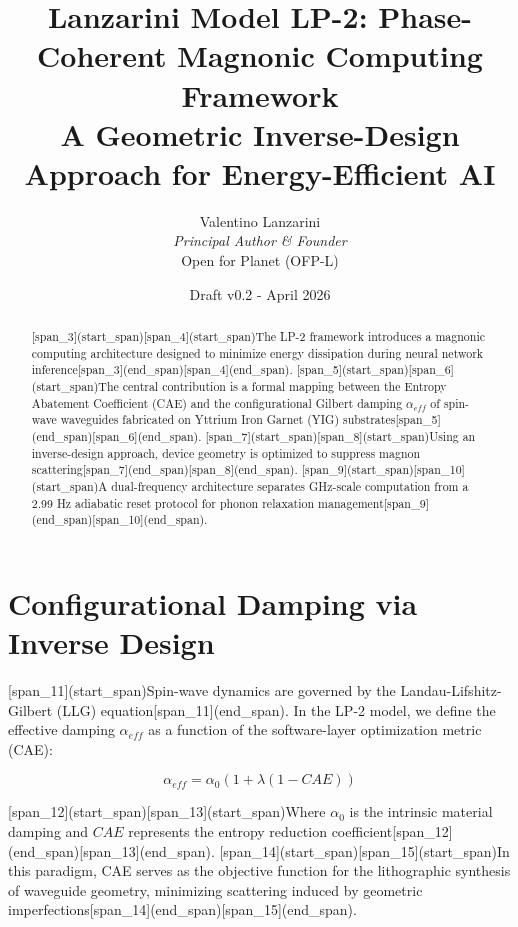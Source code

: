 \documentclass[11pt,a4paper]{article}
\title{Lanzarini Model LP-2: Phase-Coherent Magnonic Computing Framework \\ \large A Geometric Inverse-Design Approach for Energy-Efficient AI}
\author{Valentino Lanzarini \\ \textit{Principal Author \& Founder} \\ Open for Planet (OFP-L)}
\date{Draft v0.2 - April 2026}
\begin{document}
\maketitle

\begin{abstract}
[span_3](start_span)[span_4](start_span)The LP-2 framework introduces a magnonic computing architecture designed to minimize energy dissipation during neural network inference[span_3](end_span)[span_4](end_span). [span_5](start_span)[span_6](start_span)The central contribution is a formal mapping between the Entropy Abatement Coefficient (CAE) and the configurational Gilbert damping $\alpha_{eff}$ of spin-wave waveguides fabricated on Yttrium Iron Garnet (YIG) substrates[span_5](end_span)[span_6](end_span). [span_7](start_span)[span_8](start_span)Using an inverse-design approach, device geometry is optimized to suppress magnon scattering[span_7](end_span)[span_8](end_span). [span_9](start_span)[span_10](start_span)A dual-frequency architecture separates GHz-scale computation from a 2.99 Hz adiabatic reset protocol for phonon relaxation management[span_9](end_span)[span_10](end_span).
\end{abstract}

\section{Configurational Damping via Inverse Design}
[span_11](start_span)Spin-wave dynamics are governed by the Landau-Lifshitz-Gilbert (LLG) equation[span_11](end_span). In the LP-2 model, we define the effective damping $\alpha_{eff}$ as a function of the software-layer optimization metric (CAE):

\begin{equation}
\alpha_{eff} = \alpha_{0} (1 + \lambda (1 - CAE))
\end{equation}

[span_12](start_span)[span_13](start_span)Where $\alpha_{0}$ is the intrinsic material damping and $CAE$ represents the entropy reduction coefficient[span_12](end_span)[span_13](end_span). [span_14](start_span)[span_15](start_span)In this paradigm, CAE serves as the objective function for the lithographic synthesis of waveguide geometry, minimizing scattering induced by geometric imperfections[span_14](end_span)[span_15](end_span).
\end{document}
